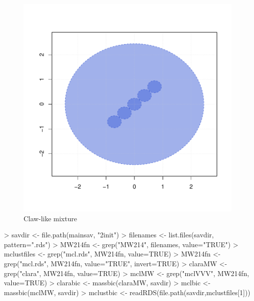 \begin{figure}[h!]
    \centering
\includegraphics{chapter3-figMW214}
    \caption{Claw-like mixture}
    \label{fig:MW214}
\end{figure}


\begin{Schunk}
\begin{Sinput}
>     savdir <- file.path(mainsav, "2init")
>     filenames <- list.files(savdir, pattern=".rds")
>     MW214fn <- grep("MW214", filenames, value="TRUE")
>     mclustfiles <- grep("mcl.rds", MW214fn, value=TRUE)
>     MW214fn <- grep("mcl.rds", MW214fn, value="TRUE", invert=TRUE)
>     claraMW <- grep("clara", MW214fn, value=TRUE)
>     mclMW <- grep("mclVVV", MW214fn, value=TRUE)
>     clarabic <- massbic(claraMW, savdir)
>     mclbic <- massbic(mclMW, savdir)
>     mclustbic <- readRDS(file.path(savdir,mclustfiles[1]))
\end{Sinput}
\end{Schunk}

